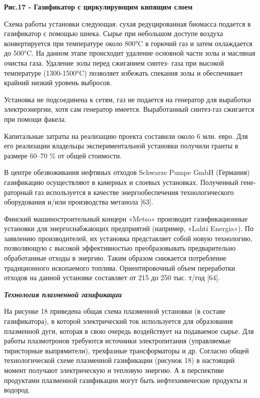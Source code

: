 
{\bfseries Рис.17 - Газификатор с циркулирующим кипящим слоем}

Схема работы установки следующая: сухая редуцированная биомасса подается
в газификатор с помощью шнека. Сырье при небольшом доступе воздуха
конвертируется при температуре около 800°C в горючий газ и затем
охлаждается до 500°C. На данном этапе происходит удаление основной части
золы и масляная очистка газа. Удаление золы перед сжиганием синтез- газа
при высокой температуре (1300-1500°C) позволяет избежать спекания золы и
обеспечивает крайний низкий уровень выбросов.

Установка не подсоединена к сетям, газ не подается на генератор для
выработки электроэнергии, хотя сам генератор имеется. Выработанный
синтез-газ сжигается при помощи факела.

Капитальные затраты на реализацию проекта составили около 6 млн. евро.
Для его реализации владельцы экспериментальной установки получили гранты
в размере 60--70 \% от общей стоимости.

В центре обезвоживания нефтяных отходов Schwarze Pumpe GmbH (Германия)
газификацию осуществляют в камерных и слоевых установках. Полученный
гене­раторный газ используется в качестве энергообеспече­ния
технологического оборудования и/или производства метанола {[}63{]}.

Финский машиностроительный концерн «Metso» про­изводит газификационные
установки для энергоснаб­жающих предприятий (например, «Lahti Energia»).
По заявлению производителей, их установка представля­ет собой новую
технологию, позволяющую с высокой эффективностью преобразовывать
предварительно обработанные отходы в энергию. Таким образом снижает­ся
потребление традиционного ископаемого топлива. Ориентировочный объем
переработки отходов на данной установке составляет от 215 до 250 тыс.
т/год {[}64{]}.

\emph{{\bfseries Технология плазменной газификации}}

На рисунке 18 приведена общая схема плазменной установки (в составе
газификатора), в которой электрический ток используется для образования
плазменной дуги, которая в свою очередь воздействует на подаваемое
сырье. Для работы плазмотронов требуются источники электропитания
(управляемые тиристорные выпрямители), трехфазные трансформаторы и др.
Согласно общей технологической схеме плазменной газификации (рисунок 18)
в настоящий момент получают электрическую и тепловую энергию. А в
перспективе продуктами плазменной газификации могут быть нефтехимические
продукты и водород.


